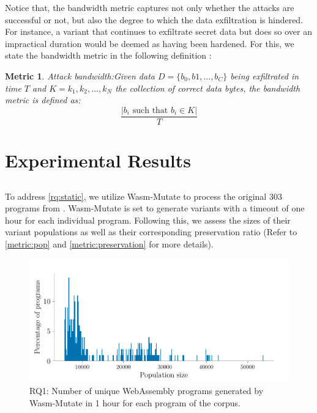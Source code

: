 \documentclass[a4paper,fleqn]{cas-dc}
\newcommand{\tool}{{\sc Wasm-Mutate}\xspace}
\newcommand{\Wasm}{WebAssembly\xspace}
\newcommand{\wasm}{\Wasm}
\newtheorem{metric}{Metric}
\begin{document}
Notice that, the bandwidth metric captures not only whether the attacks are successful or not, but also the degree to which the data exfiltration is hindered.
For instance, a variant that continues to exfiltrate secret data but does so over an impractical duration would be deemed as having been hardened. 
For this, we state the bandwidth metric in the following definition :

\begin{metric}{Attack bandwidth:}\label{metric:ber}
Given data $D=\{b_0, b1, ..., b_C\}$ being exfiltrated in time $T$ and $K = {k_1, k_2, ..., k_N}$ the collection of correct data bytes, the bandwidth metric is defined as:
$$
    \frac{|b_i\text{ such that } b_i \in K|}{T}
$$
\end{metric}




\section{Experimental Results}
\label{results}

\subsection{\rqstatic}
\label{rq:static:results}

\newcommand{\preserved}{62\%\xspace}

To address \ref{rq:static}, we utilize \tool to process the original 303 programs from \cite{arteaga2020crow}. 
\tool is set to generate variants with a timeout of one hour for each individual program. 
Following this, we assess the sizes of their variant populations as well as their corresponding preservation ratio (Refer to \autoref{metric:pop} and \autoref{metric:preservation} for more details).

\begin{figure}
    \centering
    \includegraphics[width=\linewidth]{plots/rq1/population.pdf}
    \caption{RQ1: Number of unique \wasm programs generated by \tool in 1 hour for each program of the corpus.}
  \label{rq1:plot:population}
\end{figure}
\end{document}
